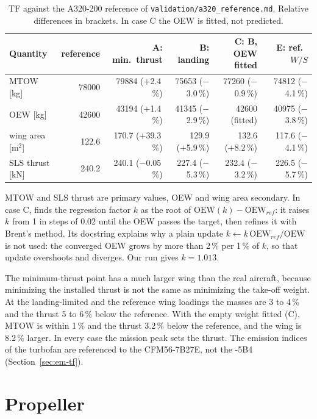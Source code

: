 \documentclass[a4paper,11pt]{article}
\begin{document}
\begin{table}[htbp]
\centering\small
\caption{TF against the A320-200 reference of \texttt{validation/a320\_reference.md}. Relative
differences in brackets. In case C the OEW is fitted, not predicted.}\label{tab:a320}
\setlength{\tabcolsep}{4pt}
\begin{tabular}{@{}lrrrrr@{}}
\toprule
Quantity & reference & A: min.\ thrust & B: landing & C: B, OEW fitted & E: ref.\ $W/S$ \\
\midrule
MTOW [kg] & \num{78000} & \num{79884} (+2.4\,\%) & \num{75653} ($-$3.0\,\%) & \num{77260} ($-$0.9\,\%) & \num{74812} ($-$4.1\,\%) \\
OEW [kg] & \num{42600} & \num{43194} (+1.4\,\%) & \num{41345} ($-$2.9\,\%) & \num{42600} (fitted) & \num{40975} ($-$3.8\,\%) \\
wing area [m$^2$] & 122.6 & 170.7 (+39.3\,\%) & 129.9 (+5.9\,\%) & 132.6 (+8.2\,\%) & 117.6 ($-$4.1\,\%) \\
SLS thrust [kN] & 240.2 & 240.1 ($-$0.05\,\%) & 227.4 ($-$5.3\,\%) & 232.4 ($-$3.2\,\%) & 226.5 ($-$5.7\,\%) \\
\bottomrule
\end{tabular}
\end{table}
MTOW and SLS thrust are primary values, OEW and wing area secondary. In case C,  finds the
regression factor $k$ as the root of $\mathrm{OEW}(k) - \mathrm{OEW}_{ref}$: it raises $k$ from 1
in steps of 0.02 until the OEW passes the target, then refines it with Brent's method. Its
docstring explains why a plain update $k \leftarrow k\,\mathrm{OEW}_{ref}/\mathrm{OEW}$ is not
used: the converged OEW grows by more than 2\,\% per 1\,\% of $k$, so that update overshoots and
diverges. Our run gives $k = 1.013$.

The minimum-thrust point has a much larger wing than the real aircraft, because minimizing the
installed thrust is not the same as minimizing the take-off weight. At the landing-limited and
the reference wing loadings the masses are 3 to 4\,\% and the thrust 5 to 6\,\% below the
reference. With the empty weight fitted (C), MTOW is within 1\,\% and the thrust 3.2\,\% below
the reference, and the wing is 8.2\,\% larger. In every case the mission peak sets the thrust. The emission indices of the
turbofan are referenced to the CFM56-7B27E, not the -5B4 (Section~\ref{sec:em-tf}).

\section{Propeller}\label{sec:prop}
\end{document}
